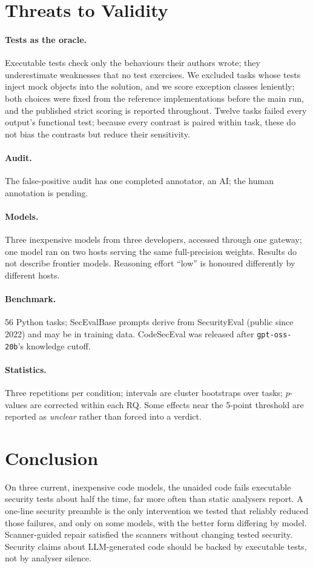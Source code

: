 \documentclass[10pt]{article}
\begin{document}
\section{Threats to Validity}
\paragraph{Tests as the oracle.} Executable tests check only the behaviours their authors wrote; they underestimate
weaknesses that no test exercises. We excluded tasks whose tests inject mock objects into the solution, and we
score exception classes leniently; both choices were fixed from the reference implementations before the main run,
and the published strict scoring is reported throughout. Twelve tasks failed every output's functional test; because
every contrast is paired within task, these do not bias the contrasts but reduce their sensitivity.
\paragraph{Audit.} The false-positive audit has one completed annotator, an AI; the human annotation is pending.
\paragraph{Models.} Three inexpensive models from three developers, accessed through one gateway; one model ran on
two hosts serving the same full-precision weights. Results do not describe frontier models. Reasoning effort
``low'' is honoured differently by different hosts.
\paragraph{Benchmark.} 56 Python tasks; SecEvalBase prompts derive from SecurityEval (public since 2022) and may be
in training data. CodeSecEval was released after \texttt{gpt-oss-20b}'s knowledge cutoff.
\paragraph{Statistics.} Three repetitions per condition; intervals are cluster bootstraps over tasks; $p$-values are
corrected within each RQ. Some effects near the 5-point threshold are reported as \emph{unclear} rather than forced
into a verdict.

\section{Conclusion}
On three current, inexpensive code models, the unaided code fails executable security tests about half the time,
far more often than static analysers report. A one-line security preamble is the only intervention we tested that
reliably reduced those failures, and only on some models, with the better form differing by model. Scanner-guided
repair satisfied the scanners without changing tested security. Security claims about LLM-generated code should be
backed by executable tests, not by analyser silence.
\end{document}
